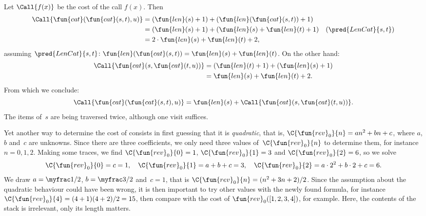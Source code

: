 Let \(\Call{f(x)}\) be the cost of the call \(f(x)\). Then
\begin{align*}
\Call{\fun{cat}(\fun{cat}(s,t),u)}
  &= (\fun{len}(s) + 1) + (\fun{len}(\fun{cat}(s,t)) + 1)\\
  &= (\fun{len}(s) + 1) + (\fun{len}(s) + \fun{len}(t) + 1) & (\pred{LenCat}{s,t})\\
  &= 2 \cdot \fun{len}(s) + \fun{len}(t) + 2,
\end{align*}
assuming \(\pred{LenCat}{s,t} \colon \fun{len}(\fun{cat}(s,t)) =
\fun{len}(s) + \fun{len}(t)\). On the other hand:
\begin{align*}
  \Call{\fun{cat}(s,\fun{cat}(t,u))}
  &= (\fun{len}(t) + 1) + (\fun{len}(s) + 1)\\
  &= \fun{len}(s) + \fun{len}(t) + 2.
\end{align*}
From which we conclude:
\begin{equation}
\Call{\fun{cat}(\fun{cat}(s,t),u)} = \fun{len}(s) +
\Call{\fun{cat}(s,\fun{cat}(t,u))}.
\label{ineq:cat_assoc}
\end{equation}
The items of~\(s\) are being traversed twice, although one visit
suffices.

Yet another way to determine the cost of  consists in
first guessing that it is \emph{quadratic}, that is, \(\C{\fun{rev}_0}{n} = an^2 + bn +
c\), where \(a\), \(b\) and~\(c\) are
unknowns.  Since there are three coefficients, we only need three
values of~\(\C{\fun{rev}_0}{n}\) to determine them, for instance
\(n=0, 1, 2\). Making some traces, we find \(\C{\fun{rev}_0}{0} = 1\),
\(\C{\fun{rev}_0}{1} = 3\) and \(\C{\fun{rev}_0}{2} = 6\), so we solve
\begin{equation*}
\C{\fun{rev}_0}{0} = c = 1,\quad
\C{\fun{rev}_0}{1} = a + b + c = 3,\quad
\C{\fun{rev}_0}{2} = a \cdot 2^2 + b \cdot 2 + c = 6.
\end{equation*}
We draw \(a = \myfrac1/2\), \(b = \myfrac3/2\) and~\(c = 1\), that is
\(\C{\fun{rev}_0}{n} = (n^2 + 3n +
2)/2\). Since the assumption about
the quadratic behaviour could have been wrong, it is then important to
try other values with the newly found formula, for instance
\(\C{\fun{rev}_0}{4} = (4+1)(4+2)/2 = 15\), then compare with the cost
of \(\fun{rev}_0([1,2,3,4])\), for
example. Here, the contents of the stack is irrelevant, only its
length matters.

